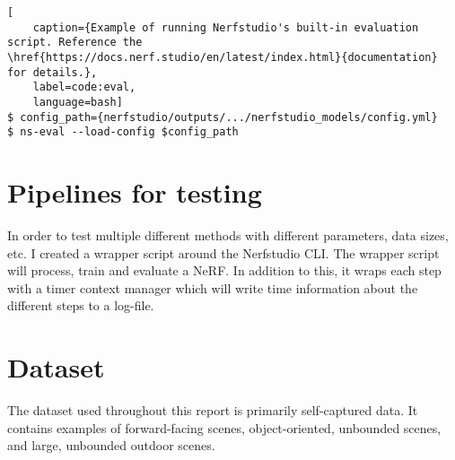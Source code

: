 \begin{lstlisting}[
    caption={Example of running Nerfstudio's built-in evaluation script. Reference the \href{https://docs.nerf.studio/en/latest/index.html}{documentation} for details.},
    label=code:eval,
    language=bash]
$ config_path={nerfstudio/outputs/.../nerfstudio_models/config.yml}
$ ns-eval --load-config $config_path
\end{lstlisting}


\section{Pipelines for testing}
In order to test multiple different methods with different parameters, data sizes, etc. I created a wrapper script around the Nerfstudio CLI. The wrapper script will process, train and evaluate a NeRF. In addition to this, it wraps each step with a timer context manager which will write time information about the different steps to a log-file.




\section{Dataset} \label{sec:dataset}
The dataset used throughout this report is primarily self-captured data. It contains examples of forward-facing scenes, object-oriented, unbounded scenes, and large, unbounded outdoor scenes.




%


